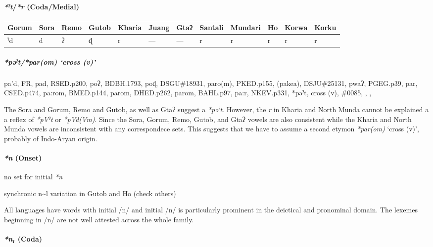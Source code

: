 \documentclass[a4paper,]{article}
\let\oldparagraph\paragraph
\renewcommand{\paragraph}[1]{\oldparagraph{#1}\mbox{}}
\let\oldsubparagraph\subparagraph
\renewcommand{\subparagraph}[1]{\oldsubparagraph{#1}\mbox{}}
\begin{document}
\paragraph{\texorpdfstring{\emph{*ˀt}/\emph{*r}
(Coda/Medial)}{*ˀt/*r (Coda/Medial)}}\label{ux2c0tr-codamedial}

\begin{longtable}[]{@{}llllllllllll@{}}
\toprule
Gorum & Sora & Remo & Gutob & Kharia & Juang & Gtaʔ & Santali & Mundari
& Ho & Korwa & Korku\tabularnewline
\midrule
\endhead
ˀd & d & ʔ & ɖ & r & --- & --- & r & r & r & r & r\tabularnewline
\bottomrule
\end{longtable}

\subparagraph{\texorpdfstring{\emph{*pəˀt}/\emph{*par(om)} `cross
(v)'}{*pəˀt/*par(om) cross (v)}}\label{pux259ux2c0tparom-cross-v}

pa'd, FR, pad, RSED.p200, poʔ, BDBH.1793, poɖ, DSGU\#18931, paro(m),
PKED.p155, (pakea), DSJU\#25131, pwaʔ, PGEG.p39, par, CSED.p474, pa:rom,
BMED.p144, parom, DHED.p262, parom, BAHL.p97, pa:r, NKEV.p331, *pəˀt,
cross (v), \#0085, , ,

The Sora and Gorum, Remo and Gutob, as well as Gtaʔ suggest a
\emph{*pəˀt}. However, the \emph{r} in Kharia and North Munda cannot be
explained a a reflex of \emph{*pVˀt} or \emph{*pVd(Vm)}. Since the Sora,
Gorum, Remo, Gutob, and Gtaʔ vowels are also consistent while the Kharia
and North Munda vowels are inconsistent with any correspondece sets.
This suggests that we have to assume a second etymon \emph{*par(om)}
`cross (v)', probably of Indo-Aryan origin.

\paragraph{\texorpdfstring{\emph{*n}
(Onset)}{*n (Onset)}}\label{n-onset}

no set for initial \emph{*n}

synchronic n\textasciitilde{}l variation in Gutob and Ho (check others)

All languages have words with initial /n/ and initial /n/ is
particularly prominent in the deictical and pronominal domain. The
lexemes beginning in /n/ are not well attested across the whole family.

\paragraph{\texorpdfstring{\emph{*n₁} (Coda)}{*n₁ (Coda)}}\label{n-coda}
\end{document}
